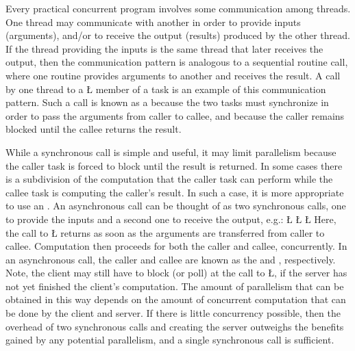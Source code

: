 \documentclass[openright,twoside]{report}
\begin{document}
Every practical concurrent program involves some communication among threads.
One thread may communicate with another in order to provide inputs (arguments), and/or to receive the output (results) produced by the other thread.
If the thread providing the inputs is the same thread that later receives the output, then the communication pattern is analogous to a sequential routine call, where one routine provides arguments to another and receives the result.
A call by one thread to a \LGinlinetrue\LGbegin\lgrinde\L{}\endlgrinde\LGend{} member of a task is an example of this communication pattern.
Such a call is known as a  because the two tasks must synchronize in order to pass the arguments from caller to callee, and because the caller remains blocked until the callee returns the result.

While a synchronous call is simple and useful, it may limit parallelism because the caller task is forced to block until the result is returned.
In some cases there is a subdivision of the computation that the caller task can perform while the callee task is computing the caller's result.
In such a case, it is more appropriate to use an .
An asynchronous call can be thought of as two synchronous calls, one to provide the inputs and a second one to receive the output, e.g.:
\LGinlinefalse\LGbegin\lgrinde
\L{}
\CE{}\L{}
\CE{}\L{}
\CE{}\endlgrinde\LGend
Here, the call to \LGinlinetrue\LGbegin\lgrinde\L{}\endlgrinde\LGend{} returns as soon as the arguments are transferred from caller to callee.
Computation then proceeds for both the caller and callee, concurrently.
In an asynchronous call, the caller and callee are known as the  and , respectively.
Note, the client may still have to block (or poll) at the call to \LGinlinetrue\LGbegin\lgrinde\L{}\endlgrinde\LGend{}, if the server has not yet finished the client's computation.
The amount of parallelism that can be obtained in this way depends on the amount of concurrent computation that can be done by the client and server.
If there is little concurrency possible, then the overhead of two synchronous calls and creating the server outweighs the benefits gained by any potential parallelism, and a single synchronous call is sufficient.
\end{document}
